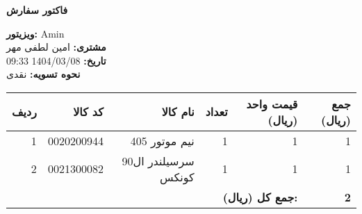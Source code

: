 \documentclass[a4paper,12pt]{article}
\begin{document}
        \begin{center}
            \textbf{\Large فاکتور سفارش}
        \end{center}
        \vspace{0.5cm}
        \begin{flushright}
            \textbf{ویزیتور:} Amin \\
            \textbf{مشتری:} امین لطفی مهر \\
            \textbf{تاریخ:} 1404/03/08 09:33 \\
            \textbf{نحوه تسویه:} نقدی
        \end{flushright}
        \vspace{0.5cm}
        \begin{longtable}{|r|r|r|r|r|r|}
            \hline
            \textbf{ردیف} & \textbf{کد کالا} & \textbf{نام کالا} & \textbf{تعداد} & \textbf{قیمت واحد (ریال)} & \textbf{جمع (ریال)} \\
            \hline
            \endhead
                    1 & 0020200944 & نيم موتور 405 & 1 & 1 & 1 \\
            \hline
            2 & 0021300082 & سرسيلندر ال90 کونکس & 1 & 1 & 1 \\
            \hline

            \hline
            \multicolumn{5}{|r|}{\textbf{جمع کل (ریال):}} & \textbf{ 2 } \\
            \hline
        \end{longtable}
        
\end{document}
